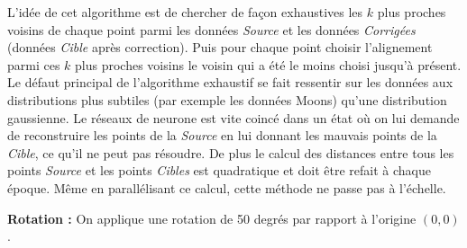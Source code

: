 L'idée de cet algorithme est de chercher de façon exhaustives les $k$ plus proches voisins de chaque point
parmi les données \emph{Source} et les données \emph{Corrigées} (données \emph{Cible} après correction).
Puis pour chaque point choisir l'alignement parmi ces $k$ plus proches voisins le voisin qui a été le moins choisi jusqu'à présent.
Le défaut principal de l'algorithme exhaustif se fait ressentir sur les données aux distributions plus subtiles
(par exemple les données Moons) qu'une distribution gaussienne. Le réseaux de neurone est vite coincé dans 
un état où on lui demande de reconstruire les points de la \emph{Source} en lui donnant les mauvais points
de la \emph{Cible}, ce qu'il ne peut pas résoudre.
De plus le calcul des distances entre tous les points \textit{Source} et les points \textit{Cibles} est quadratique
et doit être refait à chaque époque. Même en parallélisant ce calcul, cette méthode ne passe pas à l'échelle.


{\Large \textbf{Rotation :}} On applique une rotation de 50 degrés par rapport à l'origine $(0,0)$.

